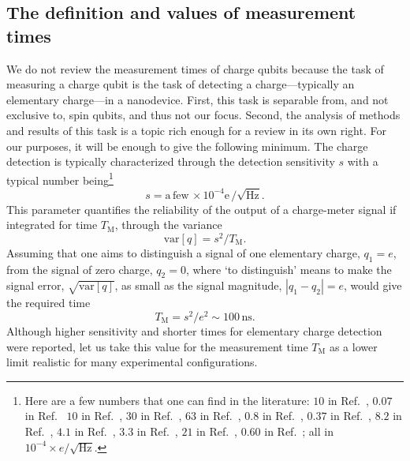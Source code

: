 \documentclass[aps, prx, showpacs, twocolumn, superscriptaddress, notitlepage, longbibliography, floatfix, nofootinbib]{revtex4-2}
\begin{document}
\subsection{The definition and values of measurement times}

We do not review the measurement times of charge qubits because the task of measuring a charge qubit is the task of detecting a charge---typically an elementary charge---in a nanodevice. First, this task is separable from, and not exclusive to, spin qubits, and thus not our focus. Second, the analysis of methods and results of this task is a topic rich enough for a review in its own right.\cite{gustavsson_electron_2009,clerk_introduction_2010,vigneau_probing_2022} For our purposes, it will be enough to give the following minimum. The charge detection is typically characterized through the detection sensitivity $s$ with a typical number being\footnote
{
Here are a few numbers that one can find in the literature: 
$10$ in Ref.~\cite{reilly_fast_2007},
$0.07$ in Ref.~\cite{angus_silicon_2008} %
$10$ in Ref.~\cite{wang_graphene_2010},
$30$ in Ref.~\cite{fringes_charge_2011}, 
$63$ in Ref.~\cite{colless_dispersive_2013},
$0.8$ in Ref.~\cite{stehlik_fast_2015},
$0.37$ in Ref.~\cite{gonzalez-zalba_probing_2015},
$8.2$ in Ref.~\cite{zajac_scalable_2016},
$4.1$ in Ref.~\cite{zheng_rapid_2019},
$3.3$ in Ref.~\cite{curry_single-shot_2019},
$21$ in Ref.~\cite{chanrion_charge_2020},
$0.60$ in Ref.~\cite{schupp_sensitive_2020};
all in $10^{-4} \times e/\surd{\mathrm{Hz}}$.
} 
\begin{equation}
s = \mathrm{a\,few}\, \times 10^{-4}\mathrm{e}\, / \sqrt{\mathrm{Hz}}.  
\label{eq:chargeSensitivity}
\end{equation}
This parameter quantifies the reliability of the output of a charge-meter signal if integrated for time $T_\mathrm{M}$, through the variance
\begin{equation}
\textrm{var}[q] = s^2 / T_\mathrm{M}.
\end{equation}
Assuming that one aims to distinguish a signal of one elementary charge, $q_1=e$, from the signal of zero charge, $q_2=0$, where `to distinguish' means to make the signal error, $\sqrt{\textrm{var}[q]}$, as small as the signal magnitude, $|q_1-q_2|=e$, would give the required time
\begin{equation}
T_\mathrm{M} = s^2 / e^2 \sim 100\, \mathrm{ns}.
\label{eq:detectionLimit}
\end{equation}
Although higher sensitivity\cite{schaal_fast_2020} and shorter times\cite{keith_single-shot_2019} for elementary charge detection were reported, let us take this value for the measurement time $T_\mathrm{M}$ as a lower limit 
realistic  for many experimental configurations. 
\end{document}
